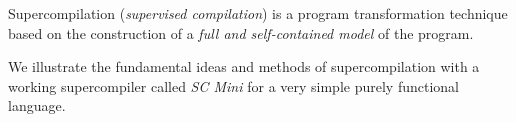 %

\begin{introduction}
Supercompilation (\emph{supervised compilation}) is a program transformation technique based on
the construction of a \emph{full and self-contained model} of the program.

We illustrate the fundamental ideas and methods of supercompilation with a working
supercompiler called \emph{SC Mini} for a very simple purely functional language.
\end{introduction}

